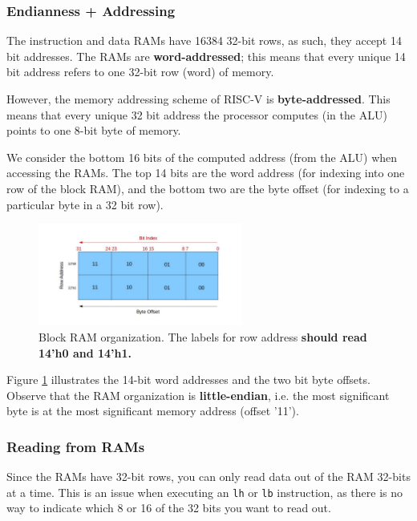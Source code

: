 \documentclass[11pt]{article}
\begin{document}
\subsubsection{Endianness + Addressing}
The instruction and data RAMs have 16384 32-bit rows, as such, they accept 14 bit addresses.
The RAMs are \textbf{word-addressed}; this means that every unique 14 bit address refers to one 32-bit row (word) of memory.

However, the memory addressing scheme of RISC-V is \textbf{byte-addressed}.
This means that every unique 32 bit address the processor computes (in the ALU) points to one 8-bit byte of memory.

We consider the bottom 16 bits of the computed address (from the ALU) when accessing the RAMs.
The top 14 bits are the word address (for indexing into one row of the block RAM), and the bottom two are the byte offset (for indexing to a particular byte in a 32 bit row).

\label{endianness}
\begin{figure}[H]
  \begin{center}
    \includegraphics[width=0.6\textwidth]{endianness_img}
    \caption{Block RAM organization. The labels for row address \textbf{should read 14'h0 and 14'h1.}}
    \label{fig:endianness_img}
  \end{center}
\end{figure}

Figure \ref{fig:endianness_img} illustrates the 14-bit word addresses and the two bit byte offsets.
Observe that the RAM organization is \textbf{little-endian}, i.e. the most significant byte is at the most significant memory address (offset '11').

\subsubsection{Reading from RAMs}
Since the RAMs have 32-bit rows, you can only read data out of the RAM 32-bits at a time.
This is an issue when executing an \verb|lh| or \verb|lb| instruction, as there is no way to indicate which 8 or 16 of the 32 bits you want to read out.
\end{document}
